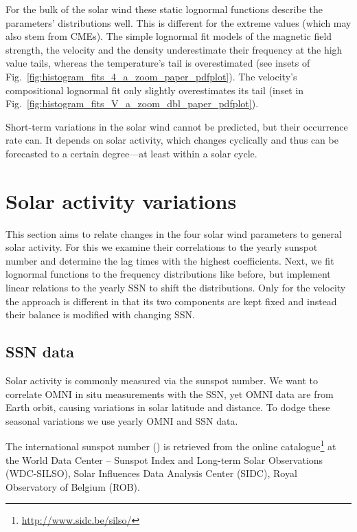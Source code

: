 For the bulk of the solar wind these static lognormal functions describe the parameters' distributions well. This is different for the extreme values (which may also stem from CMEs). The simple lognormal fit models of the magnetic field strength, the velocity and the density underestimate their frequency at the high value tails, whereas the temperature's tail is overestimated (see insets of Fig.~\ref{fig:histogram_fits_4_a_zoom_paper_pdfplot}). The velocity's compositional lognormal fit only slightly overestimates its tail (inset in Fig.~\ref{fig:histogram_fits_V_a_zoom_dbl_paper_pdfplot}).

Short-term variations in the solar wind cannot be predicted, but their occurrence rate can. It depends on solar activity, which changes cyclically and thus can be forecasted to a certain degree---at least within a solar cycle.


\section{Solar activity variations}
\label{sec:solar_activity_variations}
This section aims to relate changes in the four solar wind parameters to general solar activity. For this we examine their correlations to the yearly sunspot number and determine the lag times with the highest coefficients. Next, we fit lognormal functions to the frequency distributions like before, but implement linear relations to the yearly SSN to shift the distributions. Only for the velocity the approach is different in that its two components are kept fixed and instead their balance is modified with changing SSN.

\subsection{SSN data}
Solar activity is commonly measured via the sunspot number. We want to correlate OMNI in situ measurements with the SSN, yet OMNI data are from Earth orbit, causing variations in solar latitude and distance. To dodge these seasonal variations we use yearly OMNI and SSN data.

The international sunspot number (\citeyear{sidc}) is retrieved from the online catalogue\footnote{\url{http://www.sidc.be/silso/}} at the World Data Center -- Sunspot Index and Long-term Solar Observations (WDC-SILSO), Solar Influences Data Analysis Center (SIDC), Royal Observatory of Belgium (ROB).


